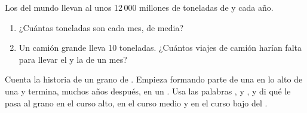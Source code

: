 \begin{exercise}[$\star\star$]\label{exo:g5:water-shapes-the-land:10}
Los  del mundo llevan al  unos 12\,000 millones de toneladas de
 y  cada año.
\begin{enumerate}
  \item[(a)] ¿Cuántas toneladas son cada mes, de media?
  \item[(b)] Un camión grande lleva 10 toneladas. ¿Cuántos viajes de camión
        harían falta para llevar el  y la  de un mes?
\end{enumerate}
\end{exercise}

\begin{exercise}[$\star\star\star$]\label{exo:g5:water-shapes-the-land:11}
Cuenta la historia de un grano de . Empieza formando parte de una 
en lo alto de una  y termina, muchos años después, en un . Usa
las palabras \emph{}, \emph{} y \emph{}, y
di qué le pasa al grano en el curso alto, en el curso medio y en el curso
bajo del .
\end{exercise}
